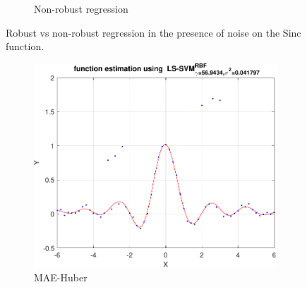 \documentclass{article}
\begin{document}
\begin{figure}[h]
\begin{subfigure}[b]{0.4\textwidth}
                 \caption{Non-robust regression}
                 \label{fig:non_robust_regression}
             \end{subfigure}
             \hspace{0.05\textwidth}
            \caption{Robust vs non-robust regression in the presence of noise on the Sinc function. }
        \end{figure}
        
        
        \begin{figure}[h]
             \centering
             \begin{subfigure}[b]{0.22\textwidth}
                 \centering
                 \includegraphics[width=\textwidth]{Assignment 2/figures/1_4/robust_mae_whuber.pdf}
                 \caption{MAE-Huber}
                 \label{fig:robust_regression_huber}
             \end{subfigure}
             \hfill
            \begin{subfigure}[b]{0.22\textwidth}
                 \centering

\end{subfigure}
\end{figure}
\end{document}
